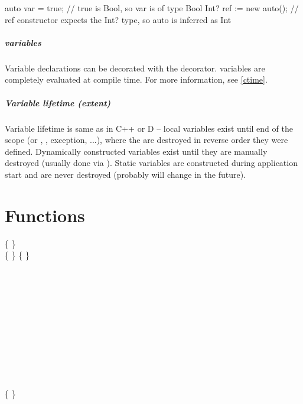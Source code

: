 \begin{code}
auto var = true; // true is Bool, so var is of type Bool
Int? ref := new auto(); // ref constructor expects the Int? type, so auto is inferred as Int
\end{code}

\paragraph{ variables}
Variable declarations can be decorated with the  decorator. \ctime variables are completely evaluated at compile time. For more information, see \autoref{ctime}.

\paragraph{Variable lifetime (extent)} Variable lifetime is same as in C++ or D -- local variables exist until end of the scope (or , , exception, ...), where the are destroyed in reverse order they were defined. Dynamically constructed variables exist until they are manually destroyed (usually done via ). Static variables are constructed during application start and are never destroyed (probably will change in the future).

\chapter{Functions}
\begin{grammar}
	 \{  \}     \\
	 \{  \} \kwd{\{} \{  \} \kwd{\}} \\
	  \\
		\grAltLn {} \\
		\grAltLn {} \\
		\grAltLn {} \\
		\grAltLn {} \\
		\grAltLn {} \\
		\grAltLn {} \\
		\grAltLn {} \\
	\\
	   \kwd{;} \\
	  \kwd{;} \\
	 \{  \}  \kwd{(}  \kwd{)}  \\
		 \\
	  \kwd{(}  \kwd{)}  \\
	   \kwd{;} \\
\end{grammar}

